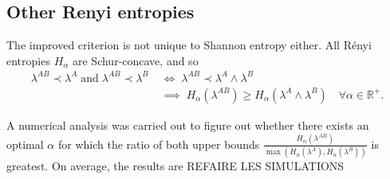 
\subsection{Other Renyi entropies}

The improved criterion is not unique to Shannon entropy either. All Rényi entropies $H_\alpha$ are Schur-concave, and so
\begin{align}
    \lambda^{AB} \prec \lambda^A \; \text{and} \; \lambda^{AB} \prec \lambda^{B} \; &\iff \; \lambda^{AB} \prec \lambda^A \wedge \lambda^B \;\\ &\implies \; H_\alpha(\lambda^{AB}) \geq H_\alpha(\lambda^A \wedge \lambda^B) \quad \forall \alpha \in \mathbb{R}^+.
\end{align}

A numerical analysis was carried out to figure out whether there exists an optimal $\alpha$ for which the ratio of both upper bounds $\frac{H_\alpha(\lambda^{AB})} {\max(H_\alpha(\lambda^A), H_\alpha(\lambda^B))}$ is greatest. On average, the results are REFAIRE LES SIMULATIONS

